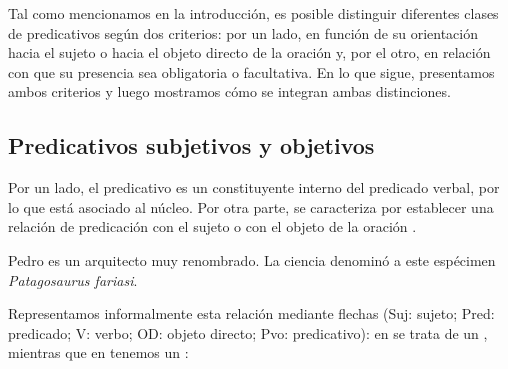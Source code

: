 Tal como mencionamos en la introducción, es posible distinguir diferentes clases
de predicativos según dos criterios: por un lado, en función de su orientación
hacia el sujeto o hacia el objeto directo de la oración y, por el otro, en
relación con que su presencia sea obligatoria o facultativa. En lo que sigue,
presentamos ambos criterios y luego mostramos cómo se integran ambas
distinciones.

\subsection{Predicativos subjetivos y objetivos}\label{sec:09-subjetivos}

Por un lado, el predicativo es un constituyente interno del predicado verbal,
por lo que está asociado al núcleo. Por otra parte, se caracteriza por
establecer una relación de predicación con el sujeto  o con
el objeto de la oración .

\begin{exe}
  \ex\label{ex:09-pedro} Pedro es un arquitecto muy renombrado.
  \ex\label{ex:09-ciencia} La ciencia denominó a este espécimen
      \textit{Patagosaurus fariasi}.
\end{exe}

Representamos informalmente esta relación mediante flechas (Suj: sujeto; Pred:
predicado; V: verbo; OD: objeto directo; Pvo: predicativo): en
 se trata de un , mientras
que en  tenemos un 
\parencite{demonte1999}:

\begin{exe}
  \ex\label{ex:09-flechas}
    \begin{xlist}
      \ex\label{ex:09-flechas-a}
          \flechasA
          \vspace{3ex}
      \ex\label{ex:09-flechas-b}
          \flechasB
          \vspace{3ex}
    \end{xlist}
\end{exe}

